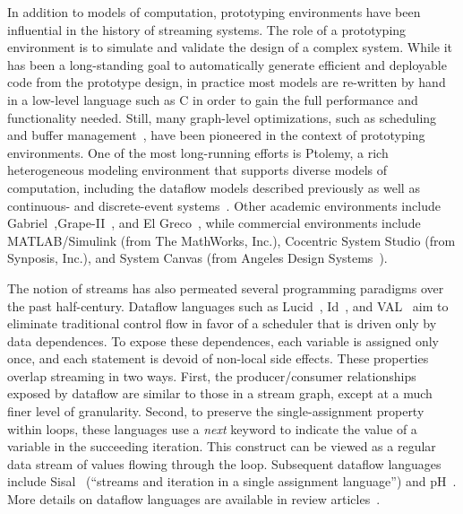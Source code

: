 In addition to models of computation, prototyping environments have
been influential in the history of streaming systems.  The role of a
prototyping environment is to simulate and validate the design of a
complex system.  While it has been a long-standing goal to
automatically generate efficient and deployable code from the
prototype design, in practice most models are re-written by hand in a
low-level language such as C in order to gain the full performance and
functionality needed.  Still, many graph-level optimizations, such as
scheduling~\cite{bhattacharyya_optimal_1995,bhattacharyya_software_1996,bhattacharyya_self-timed_1996,zitzler_multidimensional_2000,stuijk_exploring_2006}
and buffer management~\cite{ad_data_1997,murthy_shared_2001,govindarajan_minimizing_2002,murthy_buffer_2004,geilen_minimising_2005}, have
been pioneered in the context of prototyping environments.  One of the
most long-running efforts is Ptolemy, a rich heterogeneous modeling
environment that supports diverse models of computation, including the
dataflow models described previously as well as continuous- and
discrete-event systems~\cite{buck_multirate_1991,eker_taming_2003}.
Other academic environments include
Gabriel~\cite{lee_gabriel:design_1989},Grape-II~\cite{lauwereins_grape-ii:system-level_1995},
and El Greco~\cite{buck_heterogeneous_2000}, while commercial
environments include MATLAB/Simulink (from The MathWorks, Inc.),
Cocentric System Studio (from Synposis, Inc.), and System Canvas (from
Angeles Design Systems~\cite{murthy_system_2001}).


The notion of streams has also permeated several programming paradigms
over the past half-century.  Dataflow languages such as
Lucid~\cite{ashcroft_lucidnonprocedural_1977},
Id~\cite{arvind_asynchronous_1978,nikhil_id_1991}, and
VAL~\cite{ackerman_val_value_oriented_1979} aim to eliminate
traditional control flow in favor of a scheduler that is driven only
by data dependences.  To expose these dependences, each variable is
assigned only once, and each statement is devoid of non-local side
effects.  These properties overlap streaming in two ways.  First, the
producer/consumer relationships exposed by dataflow are similar to
those in a stream graph, except at a much finer level of granularity.
Second, to preserve the single-assignment property within loops, these
languages use a {\it next} keyword to indicate the value of a variable
in the succeeding iteration.  This construct can be viewed as a
regular data stream of values flowing through the loop.  Subsequent
dataflow languages include Sisal~\cite{mcgraw_sisal:_1985} (``streams
and iteration in a single assignment language'')
and pH~\cite{nikhil_implicit_2001}.
More details on dataflow languages are available in review
articles~\cite{stephens_survey_1997,johnston_advances_2004}.

